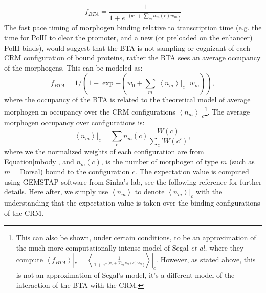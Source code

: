 \begin{equation}\label{segcon}
     f_{BTA}= \frac{1}{1 + e^{ -(w_{0} + \sum_{m}  n_m(c)   w_{m}})}
\end{equation}
The fast pace timing of morphogen binding relative to transcription time (e.g. the time for PolII to clear the promoter, and a new (or preloaded on the enhancer) PolII binds), would suggest that the BTA is not sampling or cognizant of each CRM configuration of bound proteins, rather the BTA sees an average occupancy of the morphogens.  This can be modeled as:
\begin{equation}\label{segcon2}
    f_{BTA}  = 1/(1 + \exp{ -(w_{0} + \sum_{m}  \  \left< n_m \right>|_{c} \ \ \ w_{m}) }),
\end{equation}
where the occupancy of the BTA is related to the theoretical model of average morphogen m occupancy over the CRM configurations $\left< n_m \right>|_{c}$\footnote{This can also be shown, under certain conditions, to be an approximation of the much more computationally intense model of Segal \textit{et al.}\cite{pmid18172436} where they compute $ \left< f_{BTA} \right>|_c = \left<  \frac{1}{1 + e^{ -(w_{0} + \sum_{m}  n_m(c)   w_{m}})} \right>|_c$.  However, as stated above, this is not an approximation of Segal's model, it's a different model of the interaction of the BTA with the CRM.}.  The average morphogen occupancy over configurations is:
\begin{equation}
   \left< n_m \right>|_{c} = \sum_c n_m(c) \frac{W(c)}{\sum_c' W(c')},
   \end{equation}   
   where we the normalized weights of each configuration are from Equation\ref{mbody}, and $n_m(c) $, is the number of morphogen of type $m$ (such as $m=$Dorsal) bound to the configuration $c$.  The expectation value is computed using GEMSTAP software from Sinha's lab, see the following reference for further details\cite{pmid19956545}.  Here after, we simply use $ \left<n_m \right>$ to denote $\left< n_m \right>|_{c} $ with the understanding that the expectation value is taken over the binding configurations of the CRM. 

%

